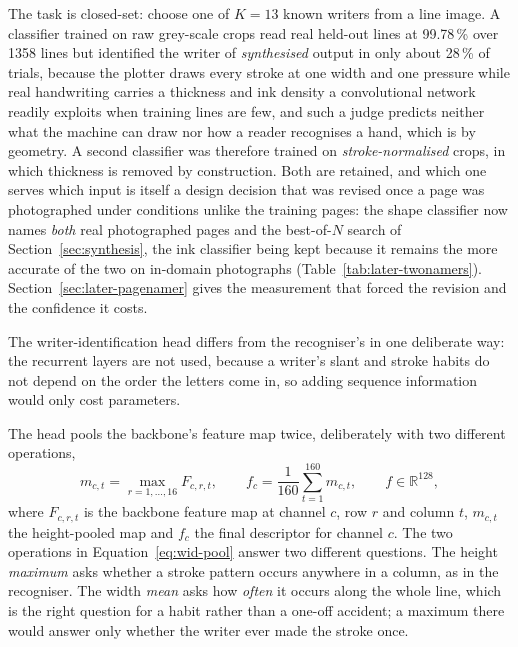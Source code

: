 The task is closed-set: choose one of $K=13$ known writers from a line image. A classifier trained on raw grey-scale crops read real held-out lines at 99.78\,\% over 1358 lines but identified the writer of \emph{synthesised} output in only about 28\,\% of trials, because the plotter draws every stroke at one width and one pressure while real handwriting carries a thickness and ink density a convolutional network readily exploits when training lines are few, and such a judge predicts neither what the machine can draw nor how a reader recognises a hand, which is by geometry. A second classifier was therefore trained on \emph{stroke-normalised} crops, in which thickness is removed by construction. Both are retained, and which one serves which input is itself a design decision that was revised once a page was photographed under conditions unlike the training pages: the shape classifier now names \emph{both} real photographed pages and the best-of-$N$ search of Section~\ref{sec:synthesis}, the ink classifier being kept because it remains the more accurate of the two on in-domain photographs (Table~\ref{tab:later-twonamers}). Section~\ref{sec:later-pagenamer} gives the measurement that forced the revision and the confidence it costs.

The writer-identification head differs from the recogniser's in one deliberate way: the recurrent layers are not used, because a writer's slant and stroke habits do not depend on the order the letters come in, so adding sequence information would only cost parameters.

The head pools the backbone's feature map twice, deliberately with two different operations,
\begin{equation}
m_{c,t}=\max_{r=1,\ldots,16}F_{c,r,t},\qquad f_c=\frac1{160}\sum_{t=1}^{160}m_{c,t},\qquad f\in\mathbb R^{128},
\label{eq:wid-pool}
\end{equation}
where $F_{c,r,t}$ is the backbone feature map at channel $c$, row $r$ and column $t$, $m_{c,t}$ the height-pooled map and $f_c$ the final descriptor for channel $c$. The two operations in Equation~\ref{eq:wid-pool} answer two different questions. The height \emph{maximum} asks whether a stroke pattern occurs anywhere in a column, as in the recogniser. The width \emph{mean} asks how \emph{often} it occurs along the whole line, which is the right question for a habit rather than a one-off accident; a maximum there would answer only whether the writer ever made the stroke once.

